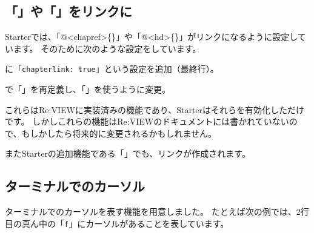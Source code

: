 \subsection*{「」や「」をリンクに}
\label{sec:1-1-19}

Starterでは、「@\textless{}chapref\textgreater{}\{\}」や「@\textless{}hd\textgreater{}\{\}」がリンクになるように設定しています。
そのために次のような設定をしています。

\begin{starteritemize}
\item {}に「\texttt{chapterlink: true}」という設定を追加（最終行）。
\item {}で「」を再定義し、「」を使うように変更。
\end{starteritemize}

\begin{starterprogram}\end{starterprogram}

これらはRe:VIEWに実装済みの機能であり、Starterはそれらを有効化しただけです。
しかしこれらの機能はRe:VIEWのドキュメントには書かれていないので、もしかしたら将来的に変更されるかもしれません。

またStarterの追加機能である「」でも、リンクが作成されます。

\subsection*{ターミナルでのカーソル}
\label{sec:1-1-20}

ターミナルでのカーソルを表す機能を用意しました。
たとえば次の例では、2行目の真ん中の「\texttt{f}」にカーソルがあることを表しています。

